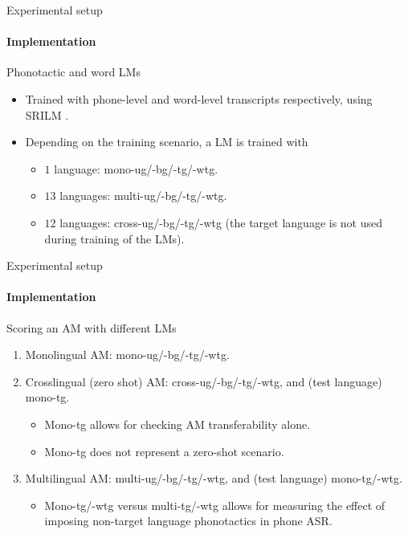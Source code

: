 \documentclass{beamer}
\begin{document}
\begin{frame}{Experimental setup}
\framesubtitle{Implementation}
\begin{block}{Phonotactic and word LMs}
\begin{itemize}
    \item Trained with phone-level and word-level transcripts respectively, using  SRILM \cite{Stolcke02srilm--}.
    \item Depending on the training scenario, a LM is trained with 
        \begin{itemize}
            \item $1$ language:  mono-ug/-bg/-tg/-wtg.
            \item $13$ languages: multi-ug/-bg/-tg/-wtg.
            \item $12$ languages: cross-ug/-bg/-tg/-wtg (the target language is not used during training of the LMs).
        \end{itemize}
\end{itemize}
    
\end{block}


    
\end{frame}
\begin{frame}{Experimental setup}
\framesubtitle{Implementation}
\begin{block}{Scoring an AM with different LMs}
\begin{enumerate}
    \item Monolingual AM: mono-ug/-bg/-tg/-wtg.
    \item Crosslingual (zero shot) AM: cross-ug/-bg/-tg/-wtg, and (test language) mono-tg.
        \begin{itemize}
            \item Mono-tg allows for checking AM transferability  alone.
            \item Mono-tg does not represent a zero-shot scenario.
        \end{itemize}
    \item Multilingual AM: multi-ug/-bg/-tg/-wtg, and (test language) mono-tg/-wtg.
        \begin{itemize}
            \item Mono-tg/-wtg versus multi-tg/-wtg allows for measuring the effect of imposing non-target language phonotactics in phone ASR.
        \end{itemize}
\end{enumerate}
    
\end{block}
    
\end{frame}
\end{document}
